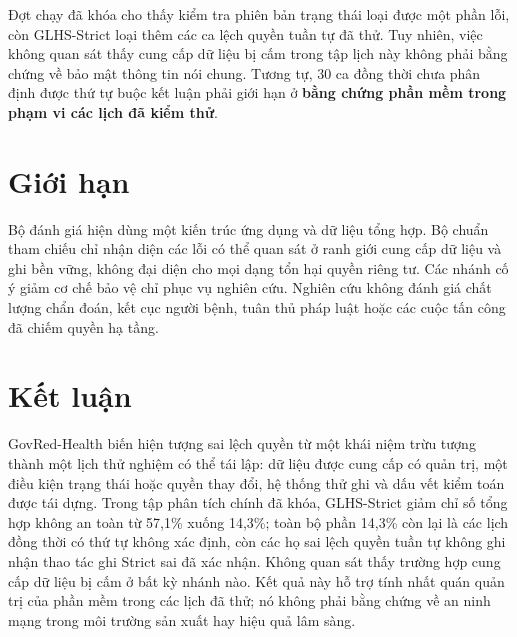 \documentclass[11pt]{article}
\begin{document}
Đợt chạy đã khóa cho thấy kiểm tra phiên bản trạng thái loại được một phần lỗi, còn GLHS-Strict loại thêm các ca lệch quyền tuần tự đã thử. Tuy nhiên, việc không quan sát thấy cung cấp dữ liệu bị cấm trong tập lịch này không phải bằng chứng về bảo mật thông tin nói chung. Tương tự, 30 ca đồng thời chưa phân định được thứ tự buộc kết luận phải giới hạn ở \textbf{bằng chứng phần mềm trong phạm vi các lịch đã kiểm thử}.

\section{Giới hạn}
Bộ đánh giá hiện dùng một kiến trúc ứng dụng và dữ liệu tổng hợp. Bộ chuẩn tham chiếu chỉ nhận diện các lỗi có thể quan sát ở ranh giới cung cấp dữ liệu và ghi bền vững, không đại diện cho mọi dạng tổn hại quyền riêng tư. Các nhánh cố ý giảm cơ chế bảo vệ chỉ phục vụ nghiên cứu. Nghiên cứu không đánh giá chất lượng chẩn đoán, kết cục người bệnh, tuân thủ pháp luật hoặc các cuộc tấn công đã chiếm quyền hạ tầng.

\section{Kết luận}
GovRed-Health biến hiện tượng sai lệch quyền từ một khái niệm trừu tượng thành một lịch thử nghiệm có thể tái lập: dữ liệu được cung cấp có quản trị, một điều kiện trạng thái hoặc quyền thay đổi, hệ thống thử ghi và dấu vết kiểm toán được tái dựng. Trong tập phân tích chính đã khóa, GLHS-Strict giảm chỉ số tổng hợp không an toàn từ 57,1\% xuống 14,3\%; toàn bộ phần 14,3\% còn lại là các lịch đồng thời có thứ tự không xác định, còn các họ sai lệch quyền tuần tự không ghi nhận thao tác ghi Strict sai đã xác nhận. Không quan sát thấy trường hợp cung cấp dữ liệu bị cấm ở bất kỳ nhánh nào. Kết quả này hỗ trợ tính nhất quán quản trị của phần mềm trong các lịch đã thử; nó không phải bằng chứng về an ninh mạng trong môi trường sản xuất hay hiệu quả lâm sàng.
\end{document}
